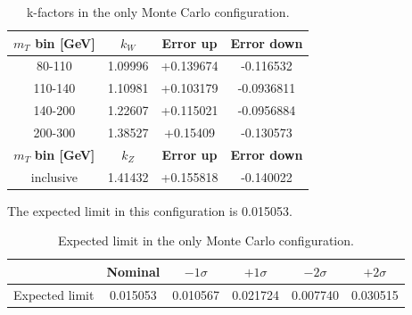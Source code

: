 \begin{table}[!htbp]
    \centering
    \begin{tabular}{c|c|c|c}
        \toprule
        $m_T$ \textbf{bin [GeV]} & \textbf{$k_W$} & \textbf{Error up} & \textbf{Error down}  \\
        \hline
         80-110 &  1.09996 &+0.139674 &-0.116532\\
      
        110-140 &  1.10981 &+0.103179 &-0.0936811\\
    
        140-200 & 1.22607 &+0.115021 &-0.0956884\\
    
        200-300 &  1.38527 &+0.15409 &-0.130573\\
  \hline
    $m_T$ \textbf{bin [GeV]} & \textbf{$k_Z$} & \textbf{Error up} & \textbf{Error down}  \\
    \hline
    inclusive & 1.41432& +0.155818 &-0.140022\\ 
    \bottomrule
    \end{tabular}
    \caption{k-factors in the only Monte Carlo configuration. }
    \label{tab:kfac_onlyMC}
\end{table}

The expected limit in this configuration is 0.015053. 
\begin{table}[!htbp]
    \centering
    \begin{tabular}{l
                    S[table-format=1.6]
                    S[table-format=1.6]
                    S[table-format=1.6]
                    S[table-format=1.6]
                    S[table-format=1.6]}
        \toprule
        & {Nominal} & {$-1\sigma$} & {$+1\sigma$} & {$-2\sigma$} & {$+2\sigma$} \\
        \midrule
        Expected limit &
        0.015053 & 0.010567 & 0.021724 & 0.007740 & 0.030515 \\
        
        \bottomrule
    \end{tabular}
    \caption{Expected limit in the only Monte Carlo configuration. }
\end{table}

